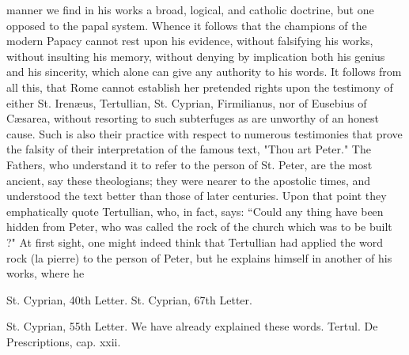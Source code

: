 manner we find in his works a broad, logical, and catholic doctrine, but one opposed to the papal system. Whence it follows that the champions of the modern Papacy cannot rest upon his evidence, without falsifying his works, without insulting his memory, without denying by implication both his genius and his sincerity, which alone can give any authority to his words. It follows from all this, that Rome cannot establish her pretended rights upon the testimony of either St. Irenæus, Tertullian, St. Cyprian, Firmilianus, nor of Eusebius of Cæsarea, without resorting to such subterfuges as are unworthy of an honest cause. Such is also their practice with respect to numerous testimonies that prove the falsity of their interpretation of the famous text, "Thou art Peter." The Fathers, who understand it to refer to the person of St. Peter, are the most ancient, say these theologians; they were nearer to the apostolic times, and understood the text better than those of later centuries. Upon that point they emphatically quote Tertullian, who, in fact, says: “Could any thing have been hidden from Peter, who was called the rock of the church which was to be built ?" At first sight, one might indeed think that Tertullian had applied the word rock (la pierre) to the person of Peter, but he explains himself in another of his works, where he

St. Cyprian, 40th Letter. St. Cyprian, 67th Letter.

St. Cyprian, 55th Letter. We have already explained these words. Tertul. De Prescriptions, cap. xxii.

